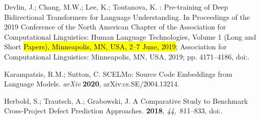 \documentclass[mathematics,review,accept,moreauthors,pdftex]{Definitions/mdpi}
\begin{document}
\begin{thebibliography}{999}
Devlin, J.; Chang, M.W.; Lee, K.; Toutanova, K.
: Pre-training of Deep Bidirectional Transformers for Language
  Understanding.
\newblock In Proceedings of the 2019 Conference of the North {A}merican Chapter
  of the Association for Computational Linguistics: Human Language
  Technologies, Volume 1 (Long and Short \hl{Papers), Minneapolis, MN, USA, 2--7 June, 2019}; Association for Computational
  Linguistics: Minneapolis, MN, USA, 2019; pp. 4171--4186,
\newblock
  doi:{\href{https://doi.org/10.18653/v1/N19-1423}{}}.

Karampatsis, R.M.; Sutton, C.
\newblock SCELMo: Source Code Embeddings from Language Models.  \emph{arXiv} \textbf{2020}, arXiv:cs.SE/2004.13214.

Herbold, S.; Trautsch, A.; Grabowski, J.
\newblock A Comparative Study to Benchmark Cross-Project Defect Prediction
  Approaches.
 {\bf 2018}, {\em
  44},~811--833,
\newblock
  doi:{\href{https://doi.org/10.1109/TSE.2017.2724538}{}}.

\end{thebibliography}


%


\end{document}

